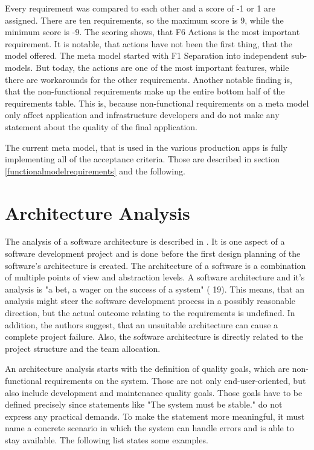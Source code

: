 Every requirement was compared to each other and a score of -1 or 1 are assigned.
There are ten requirements, so the maximum score is 9, while the minimum score is -9.
The scoring shows, that F6 Actions is the most important requirement.
It is notable, that actions have not been the first thing, that the model offered.
The meta model started with F1 Separation into independent sub-models.
But today, the actions are one of the most important features, while there are workarounds for the other requirements.
Another notable finding is, that the non-functional requirements make up the entire bottom half of the requirements table.
This is, because non-functional requirements on a meta model only affect application and infrastructure developers and do not make any statement about the quality of the final application.

The current meta model, that is used in the various production apps is fully implementing all of the acceptance criteria.
Those are described in section \ref{functionalmodelrequirements} and the following.

\section{Architecture Analysis}

The analysis of a software architecture is described in \cite{klein_evaluating_2001}.
It is one aspect of a software development project and is done before the first design planning of the software's architecture is created.
The architecture of a software is a combination of multiple points of view and abstraction levels.
A software architecture and it's analysis is "a bet, a wager on the success of a system" (\cite{klein_evaluating_2001} 19).
This means, that an analysis might steer the software development process in a possibly reasonable direction, but the actual outcome relating to the requirements is undefined.
In addition, the authors suggest, that an unsuitable architecture can cause a complete project failure.
Also, the software architecture is directly related to the project structure and the team allocation.

An architecture analysis starts with the definition of quality goals, which are non-functional requirements on the system.
Those are not only end-user-oriented, but also include development and maintenance quality goals.
Those goals have to be defined precisely since statements like "The system must be stable." do not express any practical demands.
To make the statement more meaningful, it must name a concrete scenario in which the system can handle errors and is able to stay available.
The following list states some examples.

